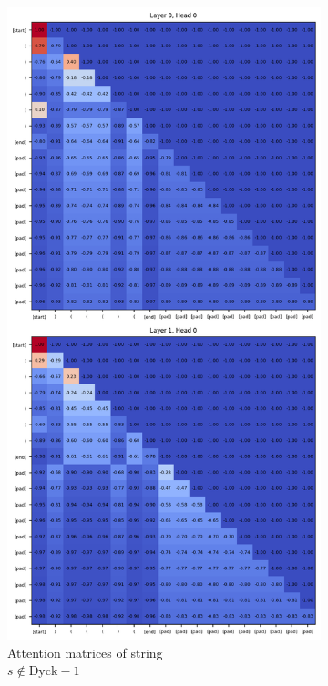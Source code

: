 \begin{figure}[h]
    \centering
    \begin{subfigure}{.5\textwidth}
      \centering
      \includegraphics[width=.8\linewidth]{docs/figs/dyck_1/causal_seq_1_dyck_1.png}
      \caption{Attention matrices of string \\ $s \notin \text{Dyck}-1$}
      \label{fig:neg-causal-dyck-1}
    \end{subfigure}%
    \begin{subfigure}{.5\textwidth}
      \centering

\end{subfigure}
\end{figure}

